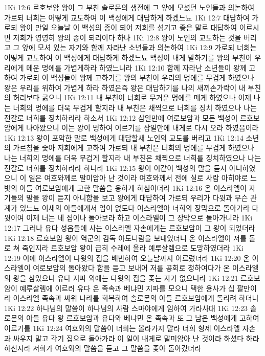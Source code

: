 1Ki 12:6  르호보암 왕이 그 부친 솔로몬의 생전에 그 앞에 모셨던 노인들과 의논하여 가로되 너희는 어떻게 교도하여 이 백성에게 대답하게 하겠느뇨
1Ki 12:7  대답하여 가로되 왕이 만일 오늘날 이 백성의 종이 되어 저희를 섬기고 좋은 말로 대답하여 이르시면 저희가 영영히 왕의 종이 되리이다 하나
1Ki 12:8  왕이 노인의 교도하는 것을 버리고 그 앞에 모셔 있는 자기와 함께 자라난 소년들과 의논하여
1Ki 12:9  가로되 너희는 어떻게 교도하여 이 백성에게 대답하게 하겠느뇨 백성이 내게 말하기를 왕의 부친이 우리에게 메운 멍에를 가볍게하라 하였느니라
1Ki 12:10  함께 자라난 소년들이 왕께 고하여 가로되 이 백성들이 왕께 고하기를 왕의 부친이 우리의 멍에를 무겁게 하였으나 왕은 우리를 위하여 가볍게 하라 하였은즉 왕은 대답하기를 나의 새끼손가락이 내 부친의 허리보다 굵으니
1Ki 12:11  내 부친이 너희로 무거운 멍에를 메게 하였으나 이제 나는 너희의 멍에를 더욱 무겁게 할지라 내 부친은 채찍으로 너희를 징치 하였으나 나는 전갈로 너희를 징치하리라 하소서
1Ki 12:12  삼일만에 여로보암과 모든 백성이 르호보암에게 나아왔으니 이는 왕이 명하여 이르기를 삼일만에 내게로 다시 오라 하였음이라
1Ki 12:13  왕이 포악한 말로 백성에게 대답할새 노인의 교도를 버리고
1Ki 12:14  소년의 가르침을 좇아 저희에게 고하여 가로되 내 부친은 너희의 멍에를 무겁게 하였으나 나는 너희의 멍에를 더욱 무겁게 할지라 내 부친은 채찍으로 너희를 징치하였으나 나는 전갈로 너희를 징치하리라 하니라
1Ki 12:15  왕이 이같이 백성의 말을 듣지 아니하였으니 이 일은 여호와께로 말미암아 난 것이라 여호와께서 전에 실로 사람 아히야로 느밧의 아들 여로보암에게 고한 말씀을 응하게 하심이더라
1Ki 12:16  온 이스라엘이 자기들의 말을 왕이 듣지 아니함을 보고 왕에게 대답하여 가로되 우리가 다윗과 무슨 관계가 있느뇨 이새의 아들에게서 업이 없도다 이스라엘아 너희의 장막으로 돌아가라 다윗이여 이제 너는 네 집이나 돌아보라 하고 이스라엘이 그 장막으로 돌아가니라
1Ki 12:17  그러나 유다 성읍들에 사는 이스라엘 자손에게는 르호보암이 그 왕이 되었더라
1Ki 12:18  르호보암 왕이 역군의 감독 아도니람을 보내었더니 온 이스라엘이 저를 돌로 쳐 죽인지라 르호보암 왕이 급히 수레에 올라 예루살렘으로 도망하였더라
1Ki 12:19  이에 이스라엘이 다윗의 집을 배반하여 오늘날까지 이르렀더라
1Ki 12:20  온 이스라엘이 여로보암의 돌아왔다 함을 듣고 보내어 저를 공회로 청하여다가 온 이스라엘의 왕을 삼았으니 유다 지파 외에는 다윗의 집을 좇는 자가 없으니라
1Ki 12:21  르호보암이 예루살렘에 이르러 유다 온 족속과 베냐민 지파를 모으니 택한 용사가 십 팔만이라 이스라엘 족속과 싸워 나라를 회복하여 솔로몬의 아들 르호보암에게 돌리려 하더니
1Ki 12:22  하나님의 말씀이 하나님의 사람 스마야에게 임하여 가라사대
1Ki 12:23  솔로몬의 아들 유다 왕 르호보암과 유다와 베냐민 온 족속과 또 그 남은 백성에게 고하여 이르기를
1Ki 12:24  여호와의 말씀이 너희는 올라가지 말라 너희 형제 이스라엘 자손과 싸우지 말고 각기 집으로 돌아가라 이 일이 내게로 말미암아 난 것이라 하셨다 하라 하신지라 저희가 여호와의 말씀을 듣고 그 말씀을 좇아 돌아갔더라
